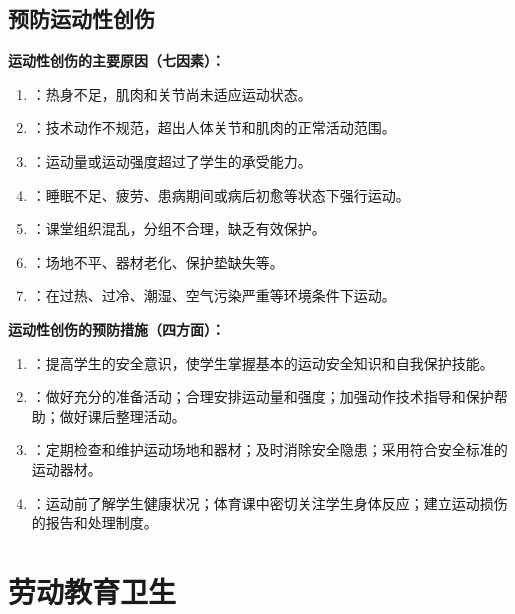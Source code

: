 \subsection{预防运动性创伤}

\begin{keybox}
\textbf{运动性创伤的主要原因（七因素）：}

\begin{enumerate}[leftmargin=*]
    \item {}：热身不足，肌肉和关节尚未适应运动状态。
    \item {}：技术动作不规范，超出人体关节和肌肉的正常活动范围。
    \item {}：运动量或运动强度超过了学生的承受能力。
    \item {}：睡眠不足、疲劳、患病期间或病后初愈等状态下强行运动。
    \item {}：课堂组织混乱，分组不合理，缺乏有效保护。
    \item {}：场地不平、器材老化、保护垫缺失等。
    \item {}：在过热、过冷、潮湿、空气污染严重等环境条件下运动。
\end{enumerate}

\textbf{运动性创伤的预防措施（四方面）：}

\begin{enumerate}[leftmargin=*]
    \item {}：提高学生的安全意识，使学生掌握基本的运动安全知识和自我保护技能。
    \item {}：做好充分的准备活动；合理安排运动量和强度；加强动作技术指导和保护帮助；做好课后整理活动。
    \item {}：定期检查和维护运动场地和器材；及时消除安全隐患；采用符合安全标准的运动器材。
    \item {}：运动前了解学生健康状况；体育课中密切关注学生身体反应；建立运动损伤的报告和处理制度。
\end{enumerate}
\end{keybox}

\section{劳动教育卫生}

